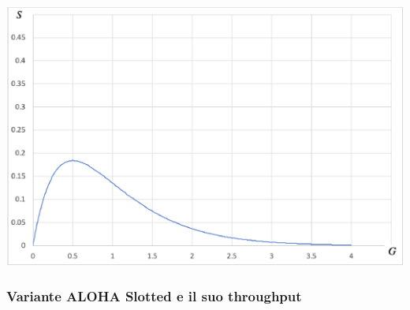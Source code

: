 \documentclass[12pt]{article}
\begin{document}
\begin{center}
    \includegraphics[scale=0.5]{aloha_throughput}
\end{center}

\subsubsection{Variante ALOHA Slotted e il suo throughput}
\end{document}
